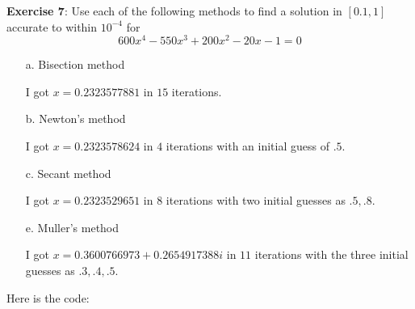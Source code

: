 \documentclass{article}
\begin{document}
\textbf{Exercise 7}: Use each of the following methods to find a solution in $[0.1, 1]$ accurate to within $10^{-4}$ for 
    \begin{equation*}
        600x^{4} - 550x^{3} + 200x^{2} - 20x - 1 = 0
    \end{equation*}
    \begin{itemize}
        \item [a.] Bisection method
            \begin{answer}
                I got $x = 0.2323577881$ in $15$ iterations.
            \end{answer}

        \item [b.] Newton's method
            \begin{answer}
                I got $x = 0.2323578624$ in $4$ iterations with an initial guess of $.5$.
            \end{answer}

        \item [c.] Secant method
            \begin{answer}
                I got $x = 0.2323529651$ in $8$ iterations with two initial guesses as $.5, .8$.
            \end{answer}

        \item [e.] Muller's method 
            \begin{answer}
                I got $x = 0.3600766973 + 0.2654917388i$ in $11$ iterations with the three initial guesses as $.3, .4, .5$.
            \end{answer}
    \end{itemize}
    Here is the code:
    \inputminted{matlab}{code/bisection/bisection.m}
    \inputminted{matlab}{code/newton/newton.m}
    \inputminted{matlab}{code/secant/secant.m}
    \inputminted{matlab}{code/muller/muller.m}
    \inputminted{matlab}{code/script8.m}
    \inputminted{matlab}{code/myfunc8.m}
\end{document}
